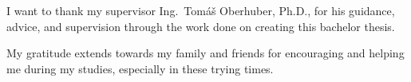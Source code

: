 I want to thank my supervisor Ing.\ Tomáš Oberhuber, Ph.D., for his guidance, advice, and supervision through the work done on creating this bachelor thesis.

My gratitude extends towards my family and friends for encouraging and helping me during my studies, especially in these trying times.